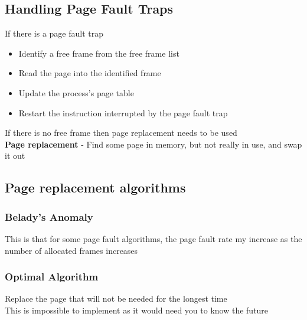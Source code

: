 \documentclass{article}[18pt]
\begin{document}
\subsection{Handling Page Fault Traps}
If there is a page fault trap
\begin{itemize}
	\item Identify a free frame from the free frame list
	\item Read the page into the identified frame
	\item Update the process's page table
	\item Restart the instruction interrupted by the page fault trap
\end{itemize}
If there is no free frame then page replacement needs to be used\\
\textbf{Page replacement} - Find some page in memory, but not really in use, and swap it out
\subsection{Page replacement algorithms}
\subsubsection{Belady's Anomaly}
This is that for some page fault algorithms, the page fault rate my increase as the number of allocated frames increases
\subsubsection{Optimal Algorithm}
Replace the page that will not be needed for the longest time\\
This is impossible to implement as it would need you to know the future
\end{document}
